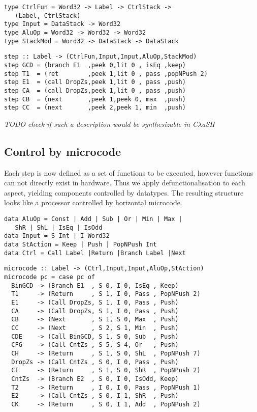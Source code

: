 \documentclass[preprint]{sigplanconf}
\def\codefamily{\sffamily\normalsize}
\def\codesmall{\sffamily\small}
\def\clash{C$\lambda$aSH\xspace}
\begin{document}
\begin{lstlisting}
type CtrlFun = Word32 -> Label -> CtrlStack ->
   (Label, CtrlStack)
type Input = DataStack -> Word32
type AluOp = Word32 -> Word32 -> Word32
type StackMod = Word32 -> DataStack -> DataStack
\end{lstlisting}

\lstset{basicstyle=\codesmall}
\begin{lstlisting}
step :: Label -> (CtrlFun,Input,Input,AluOp,StackMod)
step GCD = (branch E1  ,peek 0,lit 0 , isEq ,keep)
step T1  = (ret        ,peek 1,lit 0 , pass ,popNPush 2)
step E1  = (call DropZs,peek 1,lit 0 , pass ,push)
step CA  = (call DropZs,peek 1,lit 0 , pass ,push)
step CB  = (next       ,peek 1,peek 0, max  ,push)
step CC  = (next       ,peek 2,peek 1, min  ,push)
\end{lstlisting}
\lstset{basicstyle=\codefamily}

\textit{TODO check if such a description would be synthesizable in \clash{}}

\subsection{Control by microcode}
Each step is now defined as a set of functions to be executed, however functions can not directly exist in hardware.
Thus we apply defunctionalisation to each aspect, yielding components controlled by datatypes.
The resulting structure looks like a processor controlled by horizontal microcode.

\begin{lstlisting}
data AluOp = Const | Add | Sub | Or | Min | Max |
   ShR | ShL | IsEq | IsOdd
data Input = S Int | I Word32
data StAction = Keep | Push | PopNPush Int
data Ctrl = Call Label |Return |Branch Label |Next
\end{lstlisting}

\lstset{basicstyle=\codesmall}
\begin{lstlisting}
microcode :: Label -> (Ctrl,Input,Input,AluOp,StAction)
microcode pc = case pc of
  BinGCD -> (Branch E1  , S 0, I 0, IsEq , Keep)
  T1     -> (Return     , S 1, I 0, Pass , PopNPush 2)
  E1     -> (Call DropZs, S 1, I 0, Pass , Push)
  CA     -> (Call DropZs, S 1, I 0, Pass , Push)
  CB     -> (Next       , S 1, S 0, Max  , Push)
  CC     -> (Next       , S 2, S 1, Min  , Push)
  CDE    -> (Call BinGCD, S 1, S 0, Sub  , Push)
  CFG    -> (Call CntZs , S 5, S 4, Or   , Push)
  CH     -> (Return     , S 1, S 0, ShL  , PopNPush 7)
  DropZs -> (Call CntZs , S 0, I 0, Pass , Push)
  CI     -> (Return     , S 1, S 0, ShR  , PopNPush 2)
  CntZs  -> (Branch E2  , S 0, I 0, IsOdd, Keep)
  T2     -> (Return     , I 0, I 0, Pass , PopNPush 1)
  E2     -> (Call CntZs , S 0, I 1, ShR  , Push)
  CK     -> (Return     , S 0, I 1, Add  , PopNPush 2)
\end{lstlisting}
\lstset{basicstyle=\codefamily}
\end{document}
